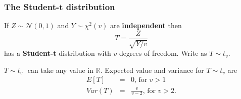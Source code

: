 \documentclass[notes=show,smaller,handout]{beamer}
\newcommand{\N}{\mathcal{N}}
\begin{document}
\begin{frame}%

\frametitle{The Student-t distribution}

\begin{definition}
If $Z\sim \N(0,1)$ and $Y\sim \chi ^{2}(v)$ are \textbf{independent}
then%
\begin{equation*}
T=\frac{Z}{\sqrt{Y/v}}
\end{equation*}%
has a \textbf{Student-t} distribution with $v$ degrees of freedom. Write as $T\sim t_{v}$.
\end{definition}
\vspace{0.5cm}
$T\sim t_{v}\,$\ can take any value in $\mathbb{R}$. Expected value and variance for $T\sim t_{v}$ are 
\begin{eqnarray*}
E\left[ T\right] &=&0\text{, for }v>1 \\
Var\left( T\right) &=&\frac{v}{v-2}\text{, for }v>2.
\end{eqnarray*}

\end{frame}%
\end{document}
